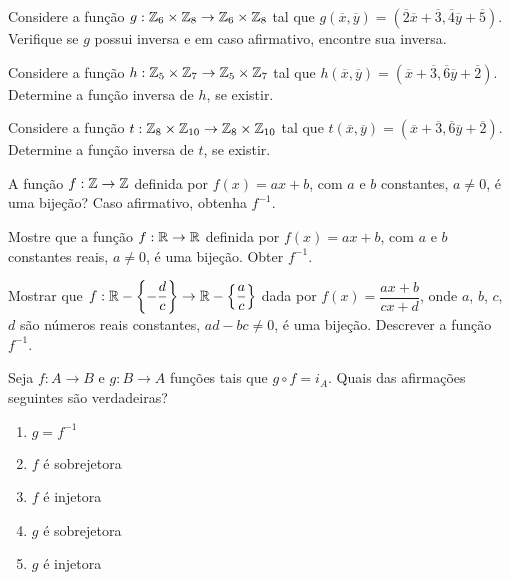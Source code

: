 \documentclass[12pt]{exam}
\begin{document}
    \questao{} Considere a fun{\c c}{\~a}o $g : \mathbb{Z}_6 \times \mathbb{Z}_8 \to \mathbb{Z}_6 \times \mathbb{Z}_8$ tal que $g(\overline{x},\overline{y}) = (\overline{2} \overline{x} + \overline{3}, \overline{4}\overline{y} + \overline{5})$. Verifique se $g$ possui inversa e em caso afirmativo, encontre sua inversa.

    \vspace{.3cm}

    \questao{} Considere a fun{\c c}{\~a}o $h : \mathbb{Z}_5 \times \mathbb{Z}_7 \to \mathbb{Z}_5 \times \mathbb{Z}_7$ tal que $h(\overline{x},\overline{y}) = (\overline{x} + \overline{3}, \overline{6}\overline{y} + \overline{2})$. Determine a fun\c{c}\~ao inversa de $h$, se existir.

    \vspace{.3cm}

    \questao{} Considere a fun{\c c}{\~a}o $t : \mathbb{Z}_8 \times \mathbb{Z}_{10} \to \mathbb{Z}_8 \times \mathbb{Z}_{10}$ tal que $t(\overline{x},\overline{y}) = (\overline{x} + \overline{3}, \overline{6}\overline{y} + \overline{2})$. Determine a fun\c{c}\~ao inversa de $t$, se existir.

    \vspace{.3cm}

    \questao{} A fun{\c c}{\~a}o $f : \mathbb{Z} \to \mathbb{Z}$ definida por $f(x) = ax + b$, com $a$ e $b$ constantes, $a \ne 0$, {\'e} uma bije{\c c}{\~a}o? Caso afirmativo, obtenha $f^{-1}$.

    \vspace{.3cm}


    \questao{} Mostre que a fun{\c c}{\~a}o $f : \mathbb{R} \to \mathbb{R}$ definida por $f(x) = ax + b$, com $a$ e $b$ constantes reais, $a \ne 0$, {\'e} uma bije{\c c}{\~a}o. Obter $f^{-1}$.

    \vspace{.3cm}

    \questao{} Mostrar que $f : \mathbb{R} - \left\{-\dfrac{d}{c}\right\} \to \mathbb{R}  - \left\{\dfrac{a}{c}\right\}$ dada por $f(x) =  \dfrac{ax + b}{cx + d}$, onde $a$, $b$, $c$, $d$ s{\~a}o n{\'u}meros reais constantes, $ad - bc \ne 0$, {\'e} uma bije{\c c}{\~a}o. Descrever a fun{\c c}{\~a}o $f^{-1}$.

    \vspace{.3cm}

    \questao{} Seja $f : A \to B$ e $g : B \to A$ fun\c{c}\~oes tais que $g \circ f = i_A$. Quais das afirma\c{c}\~oes seguintes s\~ao verdadeiras?
    \begin{enumerate}[label={\alph*})]
        \item $g = f^{-1}$

        \item $f$ \'e sobrejetora

        \item $f$ \'e injetora

        \item $g$ \'e sobrejetora

        \item $g$ \'e injetora
    \end{enumerate}
\end{document}
